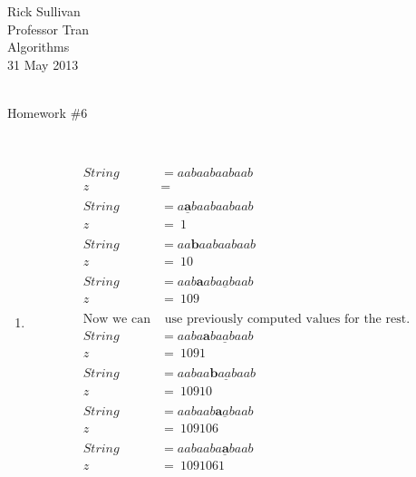 \documentclass[11pt]{article}
\begin{document}
\noindent   Rick Sullivan \\
            Professor Tran  \\
            Algorithms  \\
            31 May 2013 \\
            \\
\centerline{Homework \#6}   \\
\begin{enumerate}
    \item\begin{multicols}{2}\begin{align*}
            String &= aabaabaabaab  \\
            z &= \                 \\
            \\
            String &= a\underline{\textbf{a}}baabaabaab  \\
            z &= \ 1                \\
            \\
            String &= aa\textbf{b}aabaabaab  \\
            z &= \ 10                \\
            \\
            String &= aab\underline{\textbf{a}abaabaab}  \\
            z &= \ 109                \\
            \\
            \text{Now we can}&\text{ use previously computed values for the rest.} \\
            String &= aab\underline{a\textbf{a}baabaab}  \\
            z &= \ 1091                \\
            \\
            String &= aab\underline{aa\textbf{b}aabaab}  \\
            z &= \ 10910              \\
            \\
            String &= aab\underline{aab\textbf{a}abaab}  \\
            z &= \ 109106              \\
            \\
            String &= aab\underline{aaba\textbf{a}baab}  \\
            z &= \ 1091061             \\
            \\

\end{align*}
\end{multicols}
\end{enumerate}
\end{document}
